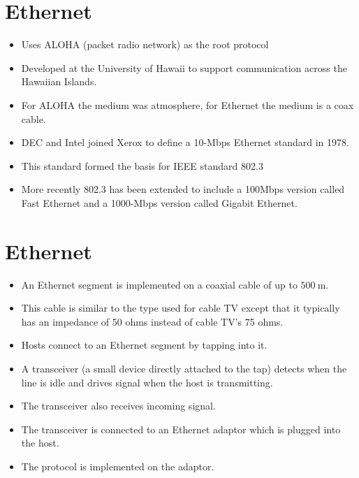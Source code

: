 \documentclass[10pt]{article}
\begin{document}
\section{Ethernet}
\begin{itemize}
  \item Uses ALOHA (packet radio network) as the root protocol

  \item Developed at the University of Hawaii to support communication across the Hawaiian Islands.

  \item For ALOHA the medium was atmosphere, for Ethernet the medium is a coax cable.

  \item DEC and Intel joined Xerox to define a 10-Mbps Ethernet standard in 1978.

  \item This standard formed the basis for IEEE standard 802.3

  \item More recently 802.3 has been extended to include a 100Mbps version called Fast Ethernet and a 1000-Mbps version called Gigabit Ethernet.

\end{itemize}

\section{Ethernet}
\begin{itemize}
  \item An Ethernet segment is implemented on a coaxial cable of up to $500 \mathrm{~m}$.

  \item This cable is similar to the type used for cable TV except that it typically has an impedance of 50 ohms instead of cable TV's 75 ohms.

  \item Hosts connect to an Ethernet segment by tapping into it.

  \item A transceiver (a small device directly attached to the tap) detects when the line is idle and drives signal when the host is transmitting.

  \item The transceiver also receives incoming signal.

  \item The transceiver is connected to an Ethernet adaptor which is plugged into the host.

  \item The protocol is implemented on the adaptor.

\end{itemize}
\end{document}
